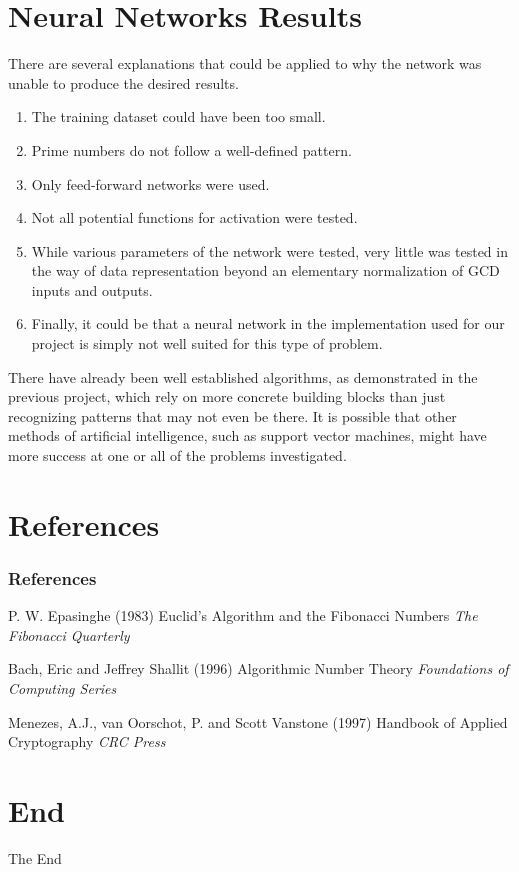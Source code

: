 \documentclass[8pt]{beamer}
\begin{document}
\section{Neural Networks Results}

\begin{frame}
There are several explanations that could be applied to why the network was unable to produce the desired results.
\begin{enumerate}
\item The training dataset could have been too small.
\item Prime numbers do not follow a well-defined pattern.
\item Only feed-forward networks were used.
\item Not all potential functions for activation were tested.
\item While various parameters of the network were tested, very little was tested in the way of data representation beyond an elementary normalization of GCD inputs and outputs.
\item Finally, it could be that a neural network in the implementation used for our project is simply not well suited for this type of problem.
\end{enumerate}
\end{frame}

\begin{frame}
There have already been well established algorithms, as demonstrated in the previous project, which rely on more concrete building blocks than just recognizing patterns that may not even be there. It is possible that other methods of artificial intelligence, such as support vector machines, might have more success at one or all of the problems investigated.
\end{frame}




\section{References}
\begin{frame}
\frametitle{References}
\footnotesize{
\begin{thebibliography}{99} %
 P. W. Epasinghe (1983)
\newblock Euclid's Algorithm and the Fibonacci Numbers
\newblock \emph{The Fibonacci Quarterly}

 Bach, Eric and Jeffrey Shallit (1996)
\newblock Algorithmic Number Theory
\newblock \emph{Foundations of Computing Series}

 Menezes, A.J., van Oorschot, P. and Scott Vanstone (1997)
\newblock Handbook of Applied Cryptography
\newblock \emph{CRC Press}
\end{thebibliography}
}
\end{frame}

\section{End}
\begin{frame}
\Huge{\centerline{The End}}
\end{frame}

\end{document}
